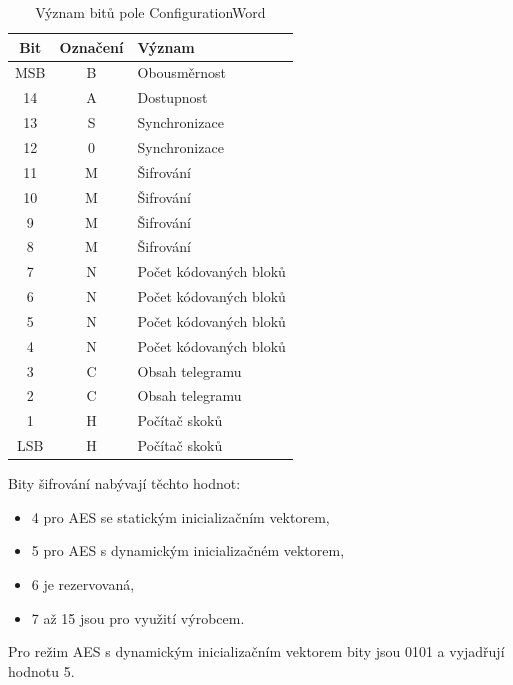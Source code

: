 \begin{table}[!ht]
\centering
\vspace{-20pt}
\caption{Význam bitů pole ConfigurationWord}
\label{TableConfigurationWord}
\begin{tabular}{|c|c|l|}
\hline
\textbf{Bit} & \textbf{Označení} & \textbf{Význam}        \\ \hline \hline
MSB          & B                 & Obousměrnost           \\ \hline
14           & A                 & Dostupnost             \\ \hline
13           & S                 & Synchronizace          \\ \hline
12           & 0                 & Synchronizace          \\ \hline
11           & M                 & Šifrování              \\ \hline
10           & M                 & Šifrování              \\ \hline
9            & M                 & Šifrování              \\ \hline
8            & M                 & Šifrování              \\ \hline
7            & N                 & Počet kódovaných bloků \\ \hline
6            & N                 & Počet kódovaných bloků \\ \hline
5            & N                 & Počet kódovaných bloků \\ \hline
4            & N                 & Počet kódovaných bloků \\ \hline
3            & C                 & Obsah telegramu        \\ \hline
2            & C                 & Obsah telegramu        \\ \hline
1            & H                 & Počítač skoků          \\ \hline
LSB          & H                 & Počítač skoků          \\  \hline  \hline
\end{tabular}
\end{table}

Bity šifrování nabývají těchto hodnot:
\begin{itemize}
	\item 4 pro AES se statickým inicializačním vektorem,
	\item 5 pro AES s dynamickým inicializačném vektorem,
	\item 6 je rezervovaná,
	\item 7 až 15 jsou pro využití výrobcem.
\end{itemize}
Pro režim AES s dynamickým inicializačním vektorem bity jsou 0101 a vyjadřují hodnotu 5.


